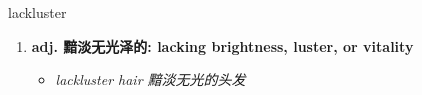 
\begin{frame}
{\huge lackluster}
\begin{center}
\begin{enumerate}\Large
  \item \textbf{adj. 黯淡无光泽的: lacking brightness, luster, or vitality}
  \begin{itemize}
    \item \em{\Large{lackluster hair 黯淡无光的头发}}
  \end{itemize}
\end{enumerate}
\end{center}
\end{frame}
